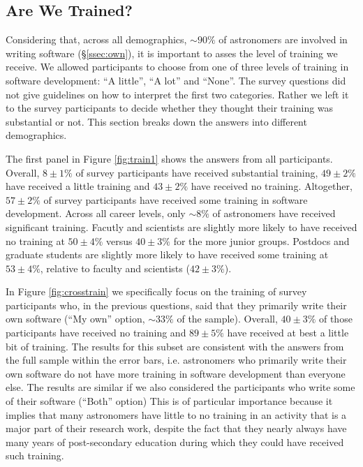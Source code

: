 \subsection{Are We Trained?}

Considering that, across all demographics, $\sim90\%$ of astronomers are involved in writing software (\S \ref{ssec:own}), it is important to asses the level of training we receive. We allowed participants to choose from one of three levels of training in software development: ``A little'', ``A lot'' and ``None''. The survey questions did not give guidelines on how to interpret the first two categories. Rather we left it to the survey participants to decide whether they thought their training was substantial or not. This section breaks down the answers into different demographics. 

The first panel in Figure \ref{fig:train1} shows the answers from all participants. Overall, $8\pm1\%$ of survey participants have received substantial training, $49\pm2\%$ have received a little training and $43\pm2\%$ have received no training. Altogether, $57\pm2\%$ of survey participants have received some training in software development. Across all career levels, only $\sim8\%$ of astronomers have received significant training. Facutly and scientists are slightly more likely to have received no training at $50\pm4\%$ versus $40\pm3\%$ for the more junior groups. Postdocs and graduate students are slightly more likely to have received some training at $53\pm4\%$, relative to faculty and scientists ($42\pm3\%$).

In Figure \ref{fig:crosstrain} we specifically focus on the training of survey participants who, in the previous questions, said that they primarily write their own software (``My own'' option, $\sim33\%$ of the sample).  Overall, $40\pm3\%$ of those participants have received no training and $89\pm5\%$ have received at best a little bit of training. The results for this subset are consistent with the answers from the full sample within the error bars, i.e. astronomers who primarily write their own software do not have more training in software development than everyone else. The results are similar if we also considered the participants who write some of their software (``Both'' option) This is of particular importance because it implies that many astronomers have little to no training in an activity that is a major part of their research work, despite the fact that they nearly always have many years of post-secondary education during which they could have received such training.

